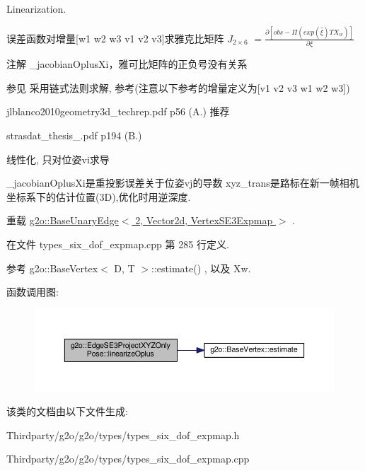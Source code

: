 Linearization. 

误差函数对增量\mbox{[}w1 w2 w3 v1 v2 v3\mbox{]}求雅克比矩阵 $J_{2\times6}$ $ = \frac{\partial [obs - \Pi(exp(\hat{\xi}) T X_w)]}{\partial \xi} $ \begin{DoxyNote}{注解}
\-\_\-jacobian\-Oplus\-Xi，雅可比矩阵的正负号没有关系 
\end{DoxyNote}
\begin{DoxySeeAlso}{参见}
采用链式法则求解, 参考(注意以下参考的增量定义为\mbox{[}v1 v2 v3 w1 w2 w3\mbox{]})
\begin{DoxyItemize}
\item jlblanco2010geometry3d\-\_\-techrep.\-pdf p56 (A.) 推荐
\item strasdat\-\_\-thesis\-\_.\-pdf p194 (B.)
\end{DoxyItemize}
\end{DoxySeeAlso}
线性化, 只对位姿vi求导

\-\_\-jacobian\-Oplus\-Xi是重投影误差关于位姿vj的导数 xyz\-\_\-trans是路标在新一帧相机坐标系下的估计位置(3\-D),优化时用逆深度. 

重载 \hyperlink{classg2o_1_1BaseUnaryEdge_a367f19b903938faf6e89dd1b0e4e722b}{g2o\-::\-Base\-Unary\-Edge$<$ 2, Vector2d, Vertex\-S\-E3\-Expmap $>$} .



在文件 types\-\_\-six\-\_\-dof\-\_\-expmap.\-cpp 第 285 行定义.



参考 g2o\-::\-Base\-Vertex$<$ D, T $>$\-::estimate() , 以及 Xw.



函数调用图\-:
\nopagebreak
\begin{figure}[H]
\begin{center}
\leavevmode
\includegraphics[width=350pt]{classg2o_1_1EdgeSE3ProjectXYZOnlyPose_abe6d775aade1277786274c328aa2c38b_cgraph}
\end{center}
\end{figure}




该类的文档由以下文件生成\-:\begin{DoxyCompactItemize}
\item 
Thirdparty/g2o/g2o/types/types\-\_\-six\-\_\-dof\-\_\-expmap.\-h\item 
Thirdparty/g2o/g2o/types/types\-\_\-six\-\_\-dof\-\_\-expmap.\-cpp\end{DoxyCompactItemize}

